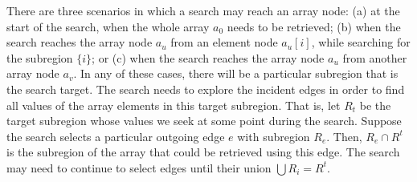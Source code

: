 
There are three scenarios in which a search may reach an array node:
(a) at the start of the search, when the whole array $a_0$ needs to be retrieved;
(b) when the search reaches the array node $a_u$ from an element node $a_u[i]$, while searching for the subregion $\{i\}$;
or
(c) when the search reaches the array node $a_u$ from another array node $a_v$.
In any of these cases, there will be a particular subregion that is the search target. 
The search needs to explore the incident edges in order to find all values of the array elements in this target subregion.
That is, let $R_t$ be the target subregion whose values we seek at some point during the search.
Suppose the search selects a particular outgoing edge $e$ with subregion $R_e$.
Then, $R_e \cap R^t$ is the subregion of the array that could be retrieved using this edge.
The search may need to continue to select edges until their union $\bigcup R_i=R^t$.


